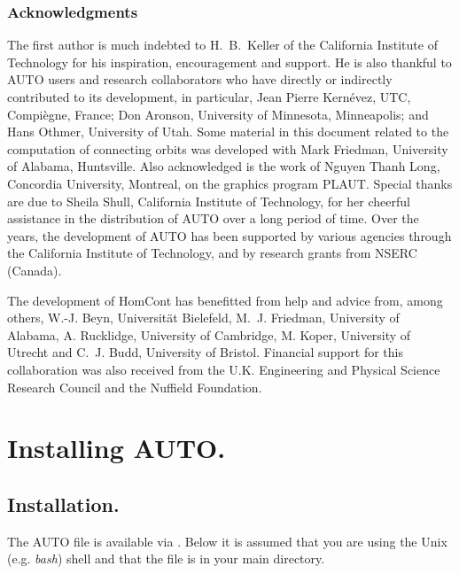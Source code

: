\documentclass[12pt]{report}
\begin{document}
\subsection*{Acknowledgments}
The first author is much indebted to H.~B.~Keller 
of the California Institute of Technology for his inspiration,
encouragement and support.
He is also thankful to {\cal AUTO} users and research collaborators who have 
directly or indirectly contributed to its development,
in particular, 
Jean Pierre Kern\'evez, UTC, Compi\`egne, France;
Don Aronson, University of Minnesota, Minneapolis; and 
Hans Othmer, University of Utah.
Some material in this document related to the computation of connecting orbits
was developed with Mark Friedman, University of Alabama, Huntsville.
Also acknowledged is the work of Nguyen Thanh Long,
Concordia University, Montreal, on the graphics program {\cal PLAUT}.
Special thanks are due to Sheila Shull, California Institute of Technology,
for her cheerful assistance in the distribution of {\cal AUTO} over a long period
of time.
Over the years, the development of {\cal AUTO} has been supported by
various agencies through the California Institute of Technology, and
by research grants from NSERC (Canada).

The development of {\cal HomCont} has benefitted from help and advice from, 
among others, 
W.-J. Beyn, Universit\"{a}t Bielefeld,
M.~J. Friedman, University of Alabama,
A. Rucklidge, University of Cambridge, 
M. Koper, University of Utrecht and 
C.~J. Budd, University of Bristol. 
Financial support for this collaboration was also received from the U.K.
Engineering and Physical Science Research Council and the Nuffield Foundation.

\chapter{Installing {\cal AUTO}.} \label{ch:Installing_AUTO}
\section{ Installation.} \label{sec:Installation}
The {\cal AUTO} file  is
available via .
Below it is assumed that you are using the Unix (e.g. \emph{bash}) shell 
and that the file  is in your main directory.
\end{document}

